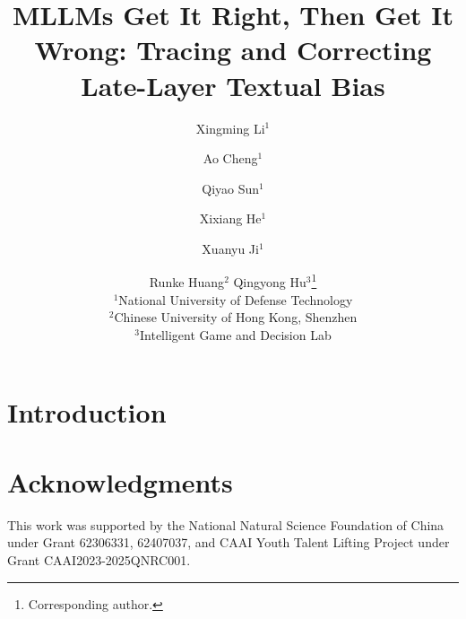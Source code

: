 \documentclass{article}
\title{MLLMs Get It Right, Then Get It Wrong: Tracing and Correcting \\ Late-Layer Textual Bias}
\author{
Xingming Li$^1$
\and
Ao Cheng$^1$
\and
Qiyao Sun$^1$
\and
Xixiang He$^1$
\and
Xuanyu Ji$^1$
\and
Runke Huang$^2$
\And
Qingyong Hu$^3$\thanks{Corresponding author.}\\
\affiliations
$^1$National University of Defense Technology\\
$^2$Chinese University of Hong Kong, Shenzhen\\
$^3$Intelligent Game and Decision Lab\\
}
\begin{document}
\maketitle

\begin{abstract}
    
\end{abstract}

\section{Introduction}















\section*{Acknowledgments}

This work was supported by the National Natural Science Foundation of China under Grant 62306331, 62407037, and CAAI Youth Talent Lifting Project under Grant CAAI2023-2025QNRC001.






\newpage
\end{document}
